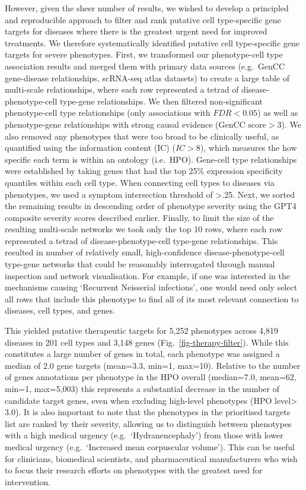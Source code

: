 \documentclass[
]{article}
\begin{document}
However, given the sheer number of results, we wished to develop a
principled and reproducible approach to filter and rank putative cell
type-specific gene targets for diseases where there is the greatest
urgent need for improved treatments. We therefore systematically
identified putative cell type-specific gene targets for severe
phenotypes. First, we transformed our phenotype-cell type association
results and merged them with primary data sources (e.g.~GenCC
gene-disease relationships, scRNA-seq atlas datasets) to create a large
table of multi-scale relationships, where each row represented a tetrad
of disease-phenotype-cell type-gene relationships. We then filtered
non-significant phenotype-cell type relationships (only associations
with \(FDR<0.05\)) as well as phenotype-gene relationships with strong
causal evidence (\(\text{GenCC score}>3\)). We also removed any
phenotypes that were too broad to be clinically useful, as quantified
using the information content (IC) (\(IC>8\)), which measures the how
specific each term is within an ontology (i.e.~HPO). Gene-cell type
relationships were established by taking genes that had the top 25\%
expression specificity quantiles within each cell type. When connecting
cell types to diseases via phenotypes, we used a symptom intersection
threshold of \textgreater.25. Next, we sorted the remaining results in
descending order of phenotype severity using the GPT4 composite severity
scores described earlier. Finally, to limit the size of the resulting
multi-scale networks we took only the top 10 rows, where each row
represented a tetrad of disease-phenotype-cell type-gene relationships.
This resulted in number of relatively small, high-confidence
disease-phenotype-cell type-gene networks that could be reasonably
interrogated through manual inspection and network visualisation. For
example, if one was interested in the mechanisms causing `Recurrent
Neisserial infections', one would need only select all rows that include
this phenotype to find all of its most relevant connection to diseases,
cell types, and genes.

This yielded putative therapeutic targets for 5,252 phenotypes across
4,819 diseases in 201 cell types and 3,148 genes
(Fig.~\ref{fig-therapy-filter}). While this constitutes a large number
of genes in total, each phenotype was assigned a median of \(2.0\) gene
targets (mean=\(3.3\), min=1, max=10). Relative to the number of genes
annotations per phenotype in the HPO overall (median=\(7.0\),
mean=\(62\), min=1, max=5,003) this represents a substantial decrease in
the number of candidate target genes, even when excluding high-level
phenotypes (HPO level\textgreater{}\(3.0\)). It is also important to
note that the phenotypes in the prioritised targets list are ranked by
their severity, allowing us to distinguish between phenotypes with a
high medical urgency (e.g.~`Hydranencephaly') from those with lower
medical urgency (e.g.~`Increased mean corpuscular volume'). This can be
useful for clinicians, biomedical scientists, and pharmaceutical
manufacturers who wish to focus their research efforts on phenotypes
with the greatest need for intervention.
\end{document}
